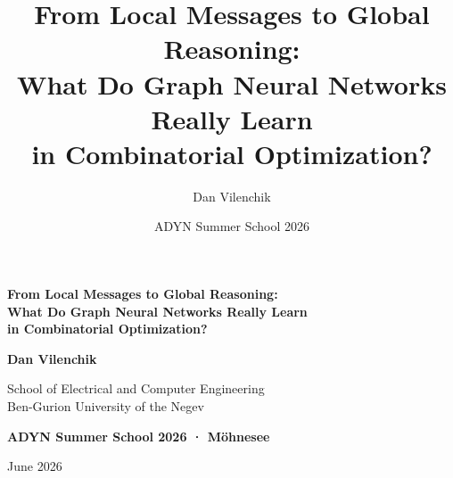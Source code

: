 \documentclass[aspectratio=169,10pt,dvipsnames]{beamer}
\title[GNNs for Combinatorial Optimization]{%
From Local Messages to Global Reasoning:\\
What Do Graph Neural Networks Really Learn\\
in Combinatorial Optimization?}
\subtitle{}
\author{Dan Vilenchik}
\institute{School of Electrical and Computer Engineering\\
Ben-Gurion University of the Negev}
\date{ADYN Summer School 2026}
\begin{document}

{
\begin{frame}[plain]

\vspace{0.9cm}

\begin{center}

{\LARGE\bfseries\textcolor{bgucolor!90!black}{
From Local Messages to Global Reasoning:\\[0.25em]
What Do Graph Neural Networks Really Learn\\
in Combinatorial Optimization?
}}

\vspace{0.95cm}

{\Large\bfseries Dan Vilenchik}

\vspace{0.35cm}

{\large\textcolor{bgucolor!90!black}{
School of Electrical and Computer Engineering\\
Ben-Gurion University of the Negev
}}

\vspace{0.45cm}

{\large\textcolor{emphcolor!85!black}{\bfseries
ADYN Summer School 2026 · Möhnesee
}}
\vfill

{\small\textcolor{black!70}{June 2026}}



\end{center}

\end{frame}
}
\end{document}
